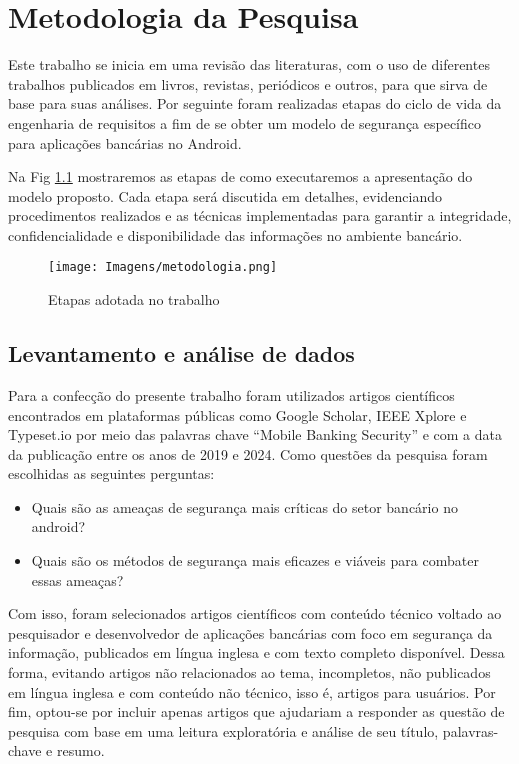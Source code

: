 
    \chapter{Metodologia da Pesquisa}

    Este trabalho se inicia em uma revisão das literaturas, com o uso de diferentes trabalhos publicados em livros, revistas, periódicos e outros, para que sirva de base para suas análises. Por seguinte foram realizadas etapas do ciclo de vida da engenharia de requisitos a fim de se obter um modelo de segurança específico para aplicações bancárias no Android.

    Na Fig \ref{metodologia} mostraremos as etapas de como executaremos a apresentação do modelo proposto. Cada etapa será discutida em detalhes, evidenciando procedimentos realizados e as técnicas implementadas para garantir a integridade, confidencialidade e disponibilidade das informações no ambiente bancário.

    \begin{figure}[H]
    \centering 
    \texttt{[image: Imagens/metodologia.png]}
    \caption{Etapas adotada no trabalho}
    \label{metodologia}
    \end{figure}

    
    \section{Levantamento e análise de dados}
    Para a confecção do presente trabalho foram utilizados artigos científicos encontrados em plataformas públicas como Google Scholar, IEEE Xplore e Typeset.io por meio das palavras chave ``Mobile Banking Security'' e com a data da publicação entre os anos de 2019 e 2024. Como questões da pesquisa foram escolhidas as seguintes perguntas:

    \begin{itemize}[topsep=3pt, partopsep=3pt, itemsep=3pt, parsep=3pt]
        \item Quais são as ameaças de segurança mais críticas do setor bancário no android? 
        \item Quais são os métodos de segurança mais eficazes e viáveis para combater essas ameaças?
    \end{itemize}
    
    Com isso, foram selecionados artigos científicos com conteúdo técnico voltado ao pesquisador e desenvolvedor de aplicações bancárias com foco em segurança da informação, publicados em língua inglesa e com texto completo disponível. Dessa forma, evitando artigos não relacionados ao tema, incompletos, não publicados em língua inglesa e com conteúdo não técnico, isso é, artigos para usuários. Por fim, optou-se por incluir apenas artigos que ajudariam a responder as questão de pesquisa com base em uma leitura exploratória e análise de seu título, palavras-chave e resumo.

